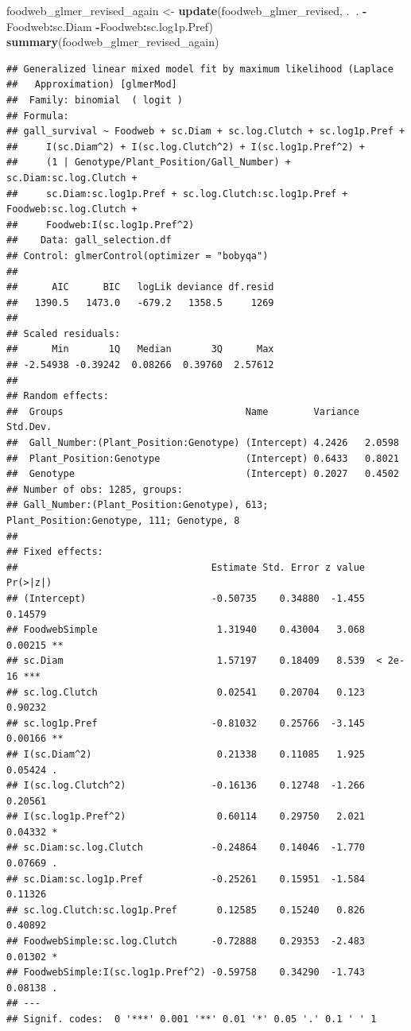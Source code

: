 \documentclass[]{elsarticle} %
\newenvironment{Shaded}{\begin{snugshade}}{\end{snugshade}}
\newcommand{\KeywordTok}[1]{\textcolor[rgb]{0.13,0.29,0.53}{\textbf{#1}}}
\newcommand{\StringTok}[1]{\textcolor[rgb]{0.31,0.60,0.02}{#1}}
\newcommand{\OperatorTok}[1]{\textcolor[rgb]{0.81,0.36,0.00}{\textbf{#1}}}
\newcommand{\NormalTok}[1]{#1}
\begin{document}
\begin{Shaded}
\begin{Highlighting}[]
\NormalTok{foodweb_glmer_revised_again <-}\StringTok{ }\KeywordTok{update}\NormalTok{(foodweb_glmer_revised, .}\OperatorTok{~}\NormalTok{. }\OperatorTok{-}\NormalTok{Foodweb}\OperatorTok{:}\NormalTok{sc.Diam }\OperatorTok{-}\NormalTok{Foodweb}\OperatorTok{:}\NormalTok{sc.log1p.Pref)}
\KeywordTok{summary}\NormalTok{(foodweb_glmer_revised_again)}
\end{Highlighting}
\end{Shaded}

\begin{verbatim}
## Generalized linear mixed model fit by maximum likelihood (Laplace
##   Approximation) [glmerMod]
##  Family: binomial  ( logit )
## Formula: 
## gall_survival ~ Foodweb + sc.Diam + sc.log.Clutch + sc.log1p.Pref +  
##     I(sc.Diam^2) + I(sc.log.Clutch^2) + I(sc.log1p.Pref^2) +  
##     (1 | Genotype/Plant_Position/Gall_Number) + sc.Diam:sc.log.Clutch +  
##     sc.Diam:sc.log1p.Pref + sc.log.Clutch:sc.log1p.Pref + Foodweb:sc.log.Clutch +  
##     Foodweb:I(sc.log1p.Pref^2)
##    Data: gall_selection.df
## Control: glmerControl(optimizer = "bobyqa")
## 
##      AIC      BIC   logLik deviance df.resid 
##   1390.5   1473.0   -679.2   1358.5     1269 
## 
## Scaled residuals: 
##      Min       1Q   Median       3Q      Max 
## -2.54938 -0.39242  0.08266  0.39760  2.57612 
## 
## Random effects:
##  Groups                                Name        Variance Std.Dev.
##  Gall_Number:(Plant_Position:Genotype) (Intercept) 4.2426   2.0598  
##  Plant_Position:Genotype               (Intercept) 0.6433   0.8021  
##  Genotype                              (Intercept) 0.2027   0.4502  
## Number of obs: 1285, groups:  
## Gall_Number:(Plant_Position:Genotype), 613; Plant_Position:Genotype, 111; Genotype, 8
## 
## Fixed effects:
##                                  Estimate Std. Error z value Pr(>|z|)    
## (Intercept)                      -0.50735    0.34880  -1.455  0.14579    
## FoodwebSimple                     1.31940    0.43004   3.068  0.00215 ** 
## sc.Diam                           1.57197    0.18409   8.539  < 2e-16 ***
## sc.log.Clutch                     0.02541    0.20704   0.123  0.90232    
## sc.log1p.Pref                    -0.81032    0.25766  -3.145  0.00166 ** 
## I(sc.Diam^2)                      0.21338    0.11085   1.925  0.05424 .  
## I(sc.log.Clutch^2)               -0.16136    0.12748  -1.266  0.20561    
## I(sc.log1p.Pref^2)                0.60114    0.29750   2.021  0.04332 *  
## sc.Diam:sc.log.Clutch            -0.24864    0.14046  -1.770  0.07669 .  
## sc.Diam:sc.log1p.Pref            -0.25261    0.15951  -1.584  0.11326    
## sc.log.Clutch:sc.log1p.Pref       0.12585    0.15240   0.826  0.40892    
## FoodwebSimple:sc.log.Clutch      -0.72888    0.29353  -2.483  0.01302 *  
## FoodwebSimple:I(sc.log1p.Pref^2) -0.59758    0.34290  -1.743  0.08138 .  
## ---
## Signif. codes:  0 '***' 0.001 '**' 0.01 '*' 0.05 '.' 0.1 ' ' 1
\end{verbatim}
\end{document}
